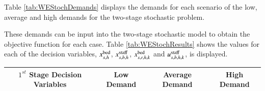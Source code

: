 \documentclass[../thesis.tex]{subfiles}
\begin{document}
{Table \ref{tab:WEStochDemands} displays the demands for each scenario of the low, average and high demands for the two-stage stochastic problem. 



These demands can be input into the two-stage stochastic model to obtain the objective function for each case. Table \ref{tab:WEStochResults} shows the values for each of the decision variables, $x^{\textnormal{bed}}_{s,h}$, $x^{\textnormal{staff}}_{s,b,h}$, $x^{\textnormal{bed}}_{s,r,h,k}$ and $u^{\textnormal{staff}}_{s,b,h,k}$, is displayed.

\begin{landscape}
\begin{table}[h!]
    \centering
    \begin{tabular}{cccccccccc}\toprule
\textbf{$1^{st}$ Stage Decision Variables} & \multicolumn{3}{c}{\textbf{Low Demand}} & \multicolumn{3}{c}{\textbf{Average Demand}} & \multicolumn{3}{c}{\textbf{High Demand}} \\\midrule


\end{tabular}
\end{table}
\end{landscape}}
\end{document}
